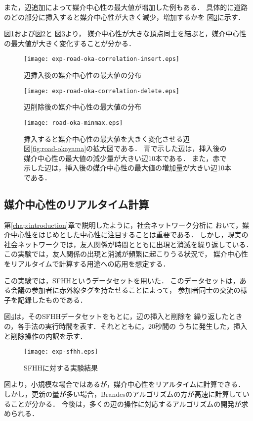 また，辺追加によって媒介中心性の最大値が増加した例もある．
具体的に道路のどの部分に挿入すると媒介中心性が大きく減少，増加するかを
図\ref{fig:road-okayama-minmax}に示す．

図\ref{fig:exp-road-oka-correlation-insert}および図\ref{fig:exp-road-oka-correlation-delete}と
図\ref{fig:road-okayama-minmax}より，
媒介中心性が大きな頂点同士を結ぶと，媒介中心性の最大値が大きく変化することが分かる．

\begin{figure}[tb]
  \centering
  \texttt{[image: exp-road-oka-correlation-insert.eps]}
  \caption{辺挿入後の媒介中心性の最大値の分布}
  \label{fig:exp-road-oka-correlation-insert}
\end{figure}

\begin{figure}[tb]
  \centering
  \texttt{[image: exp-road-oka-correlation-delete.eps]}
  \caption{辺削除後の媒介中心性の最大値の分布}
  \label{fig:exp-road-oka-correlation-delete}
\end{figure}

\begin{figure}[tb]
  \centering
  \texttt{[image: road-oka-minmax.eps]}
  \caption{
    挿入すると媒介中心性の最大値を大きく変化させる辺 \\
    図\ref{fig:road-okayama}の拡大図である．
    青で示した辺は，挿入後の媒介中心性の最大値の減少量が大きい辺10本である．
    また，赤で示した辺は，挿入後の媒介中心性の最大値の増加量が大きい辺10本である．
  }
  \label{fig:road-okayama-minmax}
\end{figure}

\subsection{媒介中心性のリアルタイム計算}
\label{subsect:exp-sfhh}

第\ref{chap:introduction}章で説明したように，社会ネットワーク分析に
おいて，媒介中心性をはじめとした中心性に注目することは重要である．
しかし，現実の社会ネットワークでは，友人関係が時間とともに出現と消滅を繰り返している．
この実験では，友人関係の出現と消滅が頻繁に起こりうる状況で，
媒介中心性をリアルタイムで計算する用途への応用を想定する．

この実験では，SFHH\cite{Genois2018}というデータセットを用いた．
このデータセットは，ある会議の参加者に赤外線タグを持たせることによって，
参加者同士の交流の様子を記録したものである．

図\ref{fig:exp-sfhh}は，そのSFHHデータセットをもとに，辺の挿入と削除を
繰り返したときの，各手法の実行時間を表す．それとともに，20秒間の
うちに発生した，挿入と削除操作の内訳を示す．

\begin{figure}[tb]
  \centering
  \texttt{[image: exp-sfhh.eps]}
  \caption{SFHHに対する実験結果}
  \label{fig:exp-sfhh}
\end{figure}

図より，小規模な場合ではあるが，媒介中心性をリアルタイムに計算できる．
しかし，更新の量が多い場合，Brandesのアルゴリズムの方が高速に計算していることが分かる．
今後は，多くの辺の操作に対応するアルゴリズムの開発が求められる．
